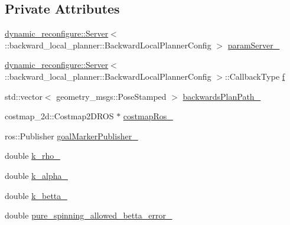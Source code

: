 \subsection*{Private Attributes}
\begin{DoxyCompactItemize}
\item 
\hyperlink{sm__ridgeback__floor__coverage__static__1_2servers_2led__action__server_2src_2led__action__server__node_8cpp_a280552a59985eb5d9311dba701679363}{dynamic\+\_\+reconfigure\+::\+Server}$<$\+::backward\+\_\+local\+\_\+planner\+::\+Backward\+Local\+Planner\+Config $>$ \hyperlink{classcl__move__base__z_1_1backward__local__planner_1_1BackwardLocalPlanner_afb349461ce9c4edee018dbb822a8cd9a}{param\+Server\+\_\+}
\item 
\hyperlink{sm__ridgeback__floor__coverage__static__1_2servers_2led__action__server_2src_2led__action__server__node_8cpp_a280552a59985eb5d9311dba701679363}{dynamic\+\_\+reconfigure\+::\+Server}$<$\+::backward\+\_\+local\+\_\+planner\+::\+Backward\+Local\+Planner\+Config $>$\+::Callback\+Type \hyperlink{classcl__move__base__z_1_1backward__local__planner_1_1BackwardLocalPlanner_aebafa83dd5fced64dc2239919a3ab8d8}{f}
\item 
std\+::vector$<$ geometry\+\_\+msgs\+::\+Pose\+Stamped $>$ \hyperlink{classcl__move__base__z_1_1backward__local__planner_1_1BackwardLocalPlanner_ad9cde5c85f782cab2ddb4030e3c3f2cf}{backwards\+Plan\+Path\+\_\+}
\item 
costmap\+\_\+2d\+::\+Costmap2\+D\+R\+OS $\ast$ \hyperlink{classcl__move__base__z_1_1backward__local__planner_1_1BackwardLocalPlanner_a4136268882a105d9e06e173d85d5c0dc}{costmap\+Ros\+\_\+}
\item 
ros\+::\+Publisher \hyperlink{classcl__move__base__z_1_1backward__local__planner_1_1BackwardLocalPlanner_a79f0ddfa686e2cd47bbc2f0bac9f3d4c}{goal\+Marker\+Publisher\+\_\+}
\item 
double \hyperlink{classcl__move__base__z_1_1backward__local__planner_1_1BackwardLocalPlanner_ad8a36184bfb011545c751109e23d3b98}{k\+\_\+rho\+\_\+}
\item 
double \hyperlink{classcl__move__base__z_1_1backward__local__planner_1_1BackwardLocalPlanner_abf7a5a56de2ee41afba7e63c0628ec35}{k\+\_\+alpha\+\_\+}
\item 
double \hyperlink{classcl__move__base__z_1_1backward__local__planner_1_1BackwardLocalPlanner_a9f257183d87f1d732cb7e404f09905ad}{k\+\_\+betta\+\_\+}
\item 
double \hyperlink{classcl__move__base__z_1_1backward__local__planner_1_1BackwardLocalPlanner_a957d163366cfeaf20d5534a7208fc326}{pure\+\_\+spinning\+\_\+allowed\+\_\+betta\+\_\+error\+\_\+}

\end{DoxyCompactItemize}
